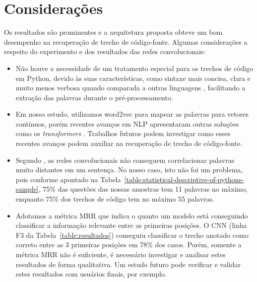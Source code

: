 \section{Considerações}
\label{sec:consideracoes-resultados}

Os resultados são prominentes e a arquitetura proposta obteve um bom desempenho na recuperação de trecho de código-fonte. Algumas considerações a respeito do experimento e dos resultados das redes convolucionais:

\begin{itemize}
    \item Não houve a necessidade de um tratamento especial para os trechos de código em Python, devido às suas características, como sintaxe mais concisa, clara e muito menos verbosa quando comparada a outras linguagens \citep{theodora-introductory-programming-python-2015}, facilitando a extração das palavras durante o pré-processamento. 
    
    \item Em nosso estudo, utilizamos \gls{word2vec} para mapear as palavras para vetores contínuos, porém recentes avanços em NLP apresentaram outras soluções como os \textit{transformers} \citep{attention-is-all-you-need-2017}. Trabalhos futuros podem investigar como esses recentes avanços podem auxiliar na recuperação de trecho de código-fonte.
    
    \item Segundo \cite{Goodfellow-et-al-2016}, as redes convolucionais não conseguem correlacionar palavras muito distantes em um sentença. No nosso caso, isto não foi um problema, pois conforme apontado na Tabela~\ref{table:statistical-descriptive-of-pythons-sample}, 75\% das questões das nossas amostras tem 11 palavras no máximo, enquanto 75\% dos trechos de código tem no máximo 55 palavras.
    
    \item Adotamos a métrica MRR que indica o quanto um modelo está conseguindo classificar a informação relevante entre as primeiras posições. O CNN (linha F3 da Tabela~\ref{table:resultados}) conseguiu classificar o trecho anotado como correto entre as 3 primeiras posições em 78\% dos casos. Porém, somente a métrica MRR não é suficiente, é necessário investigar e analisar estes resultados de forma qualitativa. Um estudo futuro pode verificar e validar estes resultados com usuários finais, por exemplo. 
\end{itemize}


